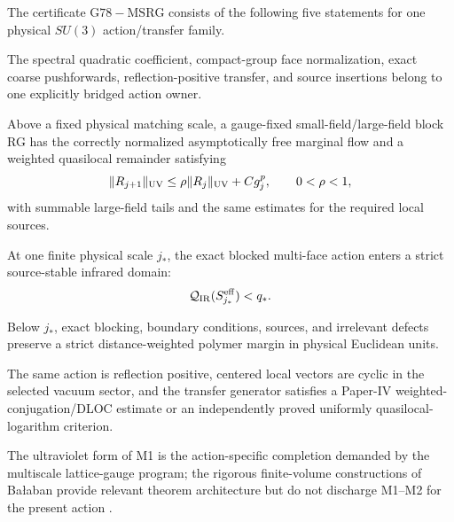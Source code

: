 \documentclass[12pt,a4paper]{article}
\begin{document}
\begin{definition}
\label{p12:def:g78-msrg}
The certificate $\mathrm{G78\!-\!MSRG}$ consists of the following
five statements for one physical $SU(3)$ action/transfer family.
\begin{description}[leftmargin=4.2em,style=nextline]
\item[\textnormal{M0}] The spectral quadratic coefficient, compact-group face
normalization, exact coarse pushforwards, reflection-positive transfer, and
source insertions belong to one explicitly bridged action owner.
\item[\textnormal{M1}] Above a fixed physical matching scale, a gauge-fixed
small-field/large-field block RG has the correctly normalized asymptotically
free marginal flow and a weighted quasilocal remainder satisfying
\[
 \|R_{j+1}\|_{\rm UV}
 \le\rho\|R_j\|_{\rm UV}+Cg_j^p,
 \qquad 0<\rho<1,
\]
with summable large-field tails and the same estimates for the required local
sources.
\item[\textnormal{M2}] At one finite physical scale $j_*$, the exact blocked
multi-face action enters a strict source-stable infrared domain:
\[
 \mathcal Q_{\rm IR}(S_{j_*}^{\rm eff})<q_*.
\]
\item[\textnormal{M3}] Below $j_*$, exact blocking, boundary conditions,
sources, and irrelevant defects preserve a strict distance-weighted polymer
margin in physical Euclidean units.
\item[\textnormal{M4}] The same action is reflection positive, centered local
vectors are cyclic in the selected vacuum sector, and the transfer generator
satisfies a Paper-IV weighted-conjugation/DLOC estimate or an independently
proved uniformly quasilocal-logarithm criterion.
\end{description}
\end{definition}

The ultraviolet form of M1 is the action-specific completion demanded by the
multiscale lattice-gauge program; the rigorous finite-volume constructions of
Ba\l aban provide relevant theorem architecture but do not discharge M1--M2
for the present action \cite{Balaban1987RGI,Balaban1988RGII}.
\end{document}
